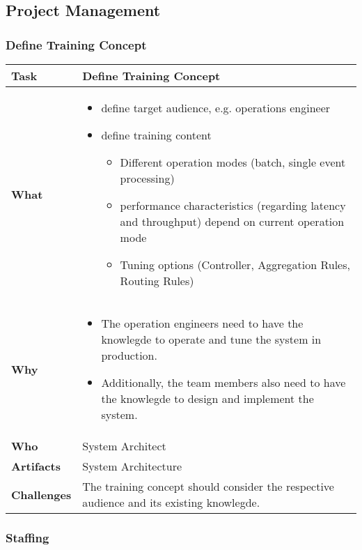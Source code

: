 \subsection{Project Management}

\subsubsection{Define Training Concept}

\begin{tabularx}{\textwidth}{@{} l X @{}}
	\caption{Define Training Concept} \label{table:ch6_Task_Define_Training_Concept}\\
	\toprule 
	\bfseries Task & Define Training Concept\\
	\midrule 
	\bfseries What & 
	\begin{itemize}
		\item define target audience, e.g. operations engineer
		\item define training content
		\begin{itemize}
			\item Different operation modes (batch, single event processing)
			\item performance characteristics (regarding latency and throughput) depend on current operation mode
			\item Tuning options (Controller, Aggregation Rules, Routing Rules)
		\end{itemize}
	\end{itemize}
	\\
	\midrule 
	\bfseries Why & 
	\begin{itemize}
		\item The operation engineers need to have the knowlegde to operate and tune the system in production.
		\item Additionally, the team members also need to have the knowlegde to design and implement the system.
	\end{itemize}
	\\
	\midrule 
	\bfseries Who & System Architect\\
	\midrule 
	\bfseries Artifacts & System Architecture\\
	\midrule 
	\bfseries Challenges & The training concept should consider the respective audience and its existing knowlegde.\\
	\bottomrule 
\end{tabularx}


\subsubsection{Staffing}

